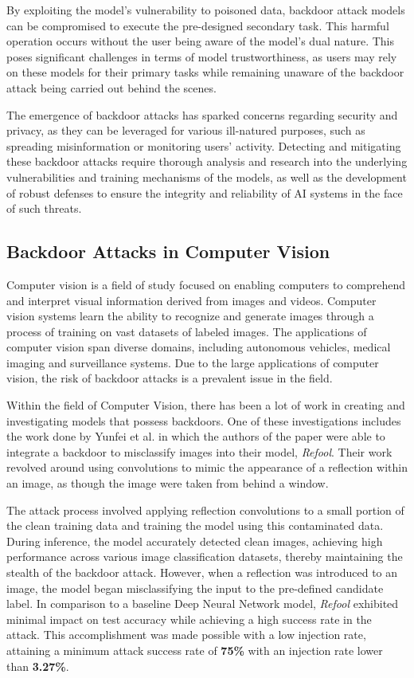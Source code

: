 By exploiting the model's vulnerability to poisoned data, backdoor attack models can be compromised to execute the pre-designed secondary task. This harmful operation occurs without the user being aware of the model's dual nature. This poses significant challenges in terms of model trustworthiness, as users may rely on these models for their primary tasks while remaining unaware of the backdoor attack being carried out behind the scenes.

The emergence of backdoor attacks has sparked concerns regarding security and privacy, as they can be leveraged for various ill-natured purposes, such as spreading misinformation or monitoring users' activity. Detecting and mitigating these backdoor attacks require thorough analysis and research into the underlying vulnerabilities and training mechanisms of the models, as well as the development of robust defenses to ensure the integrity and reliability of AI systems in the face of such threats.

\subsection{Backdoor Attacks in Computer Vision}

Computer vision is a field of study focused on enabling computers to comprehend and interpret visual information derived from images and videos. Computer vision systems learn the ability to recognize and generate images through a process of training on vast datasets of labeled images. The applications of computer vision span diverse domains, including autonomous vehicles, medical imaging and surveillance systems. Due to the large applications of computer vision, the risk of backdoor attacks is a prevalent issue in the field.

Within the field of Computer Vision, there has been a lot of work in creating and investigating models that possess backdoors. One of these investigations includes the work done by Yunfei et al. \cite{DBLP:2007.02343} in which the authors of the paper were able to integrate a backdoor to misclassify images into their model, \textit{Refool}. Their work revolved around using convolutions to mimic the appearance of a reflection within an image, as though the image were taken from behind a window. 

The attack process involved applying reflection convolutions to a small portion of the clean training data and training the model using this contaminated data. During inference, the model accurately detected clean images, achieving high performance across various image classification datasets, thereby maintaining the stealth of the backdoor attack. However, when a reflection was introduced to an image, the model began misclassifying the input to the pre-defined candidate label. In comparison to a baseline Deep Neural Network model, \textit{Refool} exhibited minimal impact on test accuracy while achieving a high success rate in the attack. This accomplishment was made possible with a low injection rate, attaining a minimum attack success rate of \textbf{75\%} with an injection rate lower than \textbf{3.27\%}.

